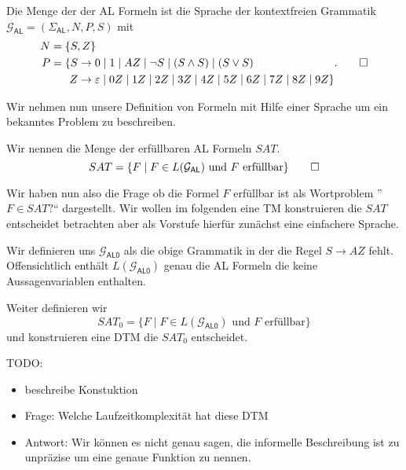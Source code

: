 \begin{Def}\label{def:gal}
Die Menge der der \ac{AL} Formeln ist die Sprache der kontextfreien Grammatik
  $\mathcal{G}_\mathsf{AL} = (\Sigma_\mathsf{AL}, N, P, S)$ mit
	\begin{align*}
		N &= \{S,Z\}\\
		P &= \begin{aligned}[t]
      \{ S & \to 0\mid 1\mid AZ\mid \neg S\mid (S\land S)\mid (S\lor S)\\
        Z & \to \varepsilon\mid 0Z\mid 1Z\mid 2Z\mid 3Z\mid 4Z\mid 5Z\mid 6Z\mid 7Z\mid 8Z\mid 9Z\}
        \end{aligned}.
      \qedhere
	\end{align*}
\end{Def}

Wir nehmen nun unsere Definition von Formeln mit Hilfe einer Sprache um ein bekanntes Problem zu beschreiben.
\begin{Def}
Wir nennen die Menge der erfüllbaren \ac{AL} Formeln $SAT$.
$$SAT=\{F\mid F\in L(\mathcal{G}_\mathsf{AL}) \text{ und $F$ erfüllbar}\}\qedhere $$
\end{Def}


Wir haben nun also die Frage ob die Formel $F$ erfüllbar ist als Wortproblem ''$F\in SAT?$`` dargestellt.
Wir wollen im folgenden eine TM konstruieren die $SAT$ entscheidet betrachten aber als Vorstufe hierfür zunächst eine einfachere Sprache.


Wir definieren uns $\mathcal{G}_\mathsf{AL0}$ als die obige Grammatik in der die Regel $S\to AZ$ fehlt.
Offensichtlich enthält $L(\mathcal{G}_\mathsf{AL0})$ genau die \ac{AL} Formeln die keine Aussagenvariablen enthalten.

Weiter definieren wir 
$$SAT_0=\{F\mid F\in L(\mathcal{G}_\mathsf{AL0}) \text{ und $F$ erfüllbar}\}$$
und konstruieren eine DTM die $SAT_0$ entscheidet.

{\color{red}
TODO: 

\begin{itemize}
 \item beschreibe Konstuktion
 \item Frage: Welche Laufzeitkomplexität hat diese DTM
 \item Antwort: Wir können es nicht genau sagen, die informelle Beschreibung ist zu unpräzise um eine genaue Funktion zu nennen.
\end{itemize}

}

